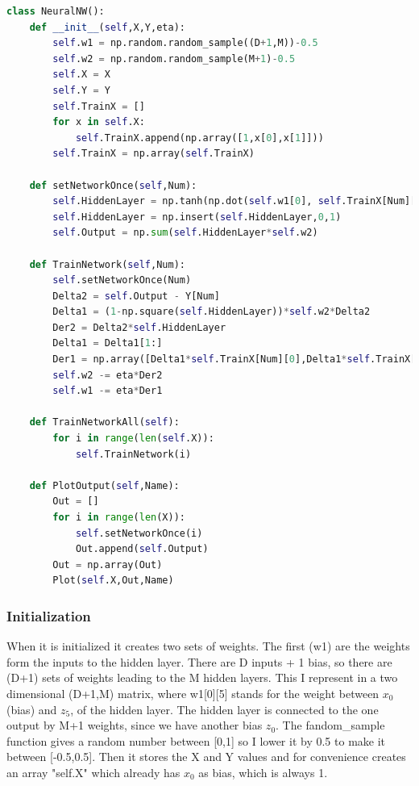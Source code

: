 \documentclass[a4paper]{article}
\begin{document}
\begin{lstlisting}[language=Python]
class NeuralNW():
    def __init__(self,X,Y,eta):
        self.w1 = np.random.random_sample((D+1,M))-0.5
        self.w2 = np.random.random_sample(M+1)-0.5
        self.X = X
        self.Y = Y
        self.TrainX = []
        for x in self.X:
            self.TrainX.append(np.array([1,x[0],x[1]]))
        self.TrainX = np.array(self.TrainX)

    def setNetworkOnce(self,Num):
        self.HiddenLayer = np.tanh(np.dot(self.w1[0], self.TrainX[Num][0]) + np.dot(self.w1[1] , self.TrainX[Num][1]) + np.dot(self.w1[2],self.TrainX[Num][2]))
        self.HiddenLayer = np.insert(self.HiddenLayer,0,1)
        self.Output = np.sum(self.HiddenLayer*self.w2)

    def TrainNetwork(self,Num):
        self.setNetworkOnce(Num)
        Delta2 = self.Output - Y[Num]
        Delta1 = (1-np.square(self.HiddenLayer))*self.w2*Delta2
        Der2 = Delta2*self.HiddenLayer
        Delta1 = Delta1[1:]
        Der1 = np.array([Delta1*self.TrainX[Num][0],Delta1*self.TrainX[Num][1] , Delta1*self.TrainX[Num][2]])
        self.w2 -= eta*Der2
        self.w1 -= eta*Der1
        
    def TrainNetworkAll(self):
        for i in range(len(self.X)):
            self.TrainNetwork(i)
            
    def PlotOutput(self,Name):
        Out = []
        for i in range(len(X)):
            self.setNetworkOnce(i)
            Out.append(self.Output)
        Out = np.array(Out)
        Plot(self.X,Out,Name)
\end{lstlisting}

\subsubsection*{Initialization}

When it is initialized it creates two sets of weights. The first (w1) are the weights form the inputs to the hidden layer. There are D inputs + 1 bias, so there are (D+1) sets of weights leading to the M hidden layers. This I represent in a two dimensional (D+1,M) matrix, where w1[0][5] stands for the weight between $x_0$ (bias) and $z_5$, of the hidden layer.
The hidden layer is connected to the one output by M+1 weights, since we have another bias $z_0$. The fandom\_sample function gives a random number between [0,1] so I lower it by 0.5 to make it between [-0.5,0.5].
Then it stores the X and Y values and for convenience creates an array "self.X" which already has $x_0$ as bias, which is always 1.
\end{document}
